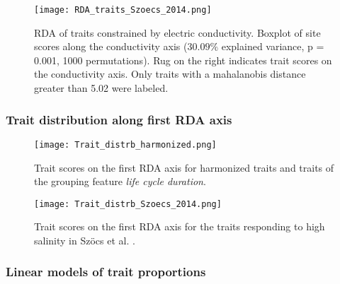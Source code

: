 \documentclass[../Draft_harmonization_paper.tex]{subfiles}
\begin{document}
\begin{figure}[H]
    \centering
    \texttt{[image: RDA\_traits\_Szoecs\_2014.png]}
    \caption{RDA of traits constrained by electric conductivity. Boxplot of site scores along the conductivity axis ($30.09 \%$ explained variance, p = 0.001, 1000 permutations). Rug on the right indicates trait scores on the conductivity axis. Only traits with a mahalanobis distance greater than 5.02 were labeled.
    } 
\end{figure}

\subsubsection*{Trait distribution along first RDA axis} 


\begin{figure}[H]
    \centering
    \texttt{[image: Trait\_distrb\_harmonized.png]}
    \caption{Trait scores on the first RDA axis for harmonized traits and traits of the grouping feature \textit{life cycle duration}.
    } 
\end{figure}

\begin{figure}[H]
    \centering
    \texttt{[image: Trait\_distrb\_Szoecs\_2014.png]}
    \caption{Trait scores on the first RDA axis for the traits responding to high salinity in Szöcs et al. \cite{szocs_effects_2014}
    .
    }
\end{figure}

\newpage
\subsubsection*{Linear models of trait proportions}
\end{document}
